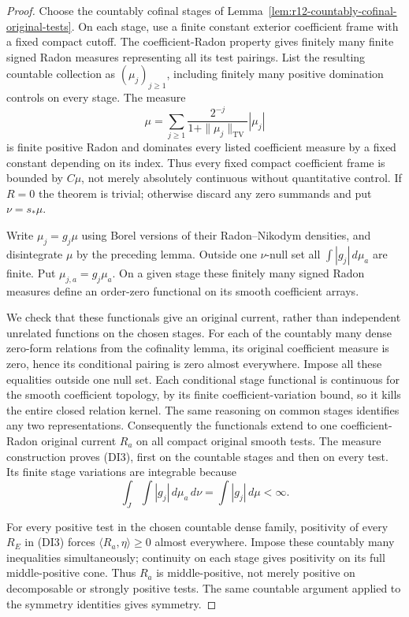 \begin{proof}
Choose the countably cofinal stages of
Lemma~\ref{lem:r12-countably-cofinal-original-tests}. On each stage,
use a finite constant exterior coefficient frame with a fixed
compact cutoff. The coefficient-Radon property gives finitely many
finite signed Radon measures representing all its test pairings.
List the resulting countable collection as $(\mu_j)_{j\ge1}$,
including finitely many positive domination controls on every stage.
The measure
\[
            \mu=\sum_{j\ge1}
                    \frac{2^{-j}}{1+\|\mu_j\|_{\mathrm{TV}}}|\mu_j|
 \tag{DI5}
\]
is finite positive Radon and dominates every listed coefficient
measure by a fixed constant depending on its index. Thus every
fixed compact coefficient frame is bounded by $C\mu$, not merely
absolutely continuous without quantitative control.
If $R=0$ the theorem is trivial; otherwise discard any
zero summands and put $\nu=s_*\mu$.

Write $\mu_j=g_j\mu$ using Borel versions of their Radon--Nikodym
densities, and disintegrate $\mu$ by the preceding lemma. Outside
one $\nu$-null set all $\int|g_j|\,d\mu_a$ are finite. Put
$\mu_{j,a}=g_j\mu_a$. On a given stage these finitely many signed
Radon measures define an order-zero functional on its smooth
coefficient arrays.

We check that these functionals give an original current, rather
than independent unrelated functions on the chosen stages. For
each of the countably many dense zero-form relations from the
cofinality lemma, its original coefficient measure is zero, hence
its conditional pairing is zero almost everywhere. Impose all
these equalities outside one null set. Each conditional stage
functional is continuous for the smooth coefficient topology,
by its finite coefficient-variation bound, so it kills the entire
closed relation kernel. The same reasoning on common stages
identifies any two representations. Consequently the functionals
extend to one coefficient-Radon original current $R_a$ on all
compact original smooth tests. The measure construction proves
(DI3), first on the countable stages and then on every test.
Its finite stage variations are integrable because
\[
                 \int_J\int|g_j|\,d\mu_a\,d\nu
                                           =\int|g_j|\,d\mu<\infty.
 \tag{DI6}
\]

For every positive test in the chosen countable dense family,
positivity of every $R_E$ in (DI3) forces
$\langle R_a,\eta\rangle\ge0$ almost everywhere. Impose these
countably many inequalities simultaneously; continuity on each
stage gives positivity on its full middle-positive cone. Thus
$R_a$ is middle-positive, not merely positive on decomposable or
strongly positive tests. The same countable argument applied to
the symmetry identities gives symmetry.


\end{proof}
